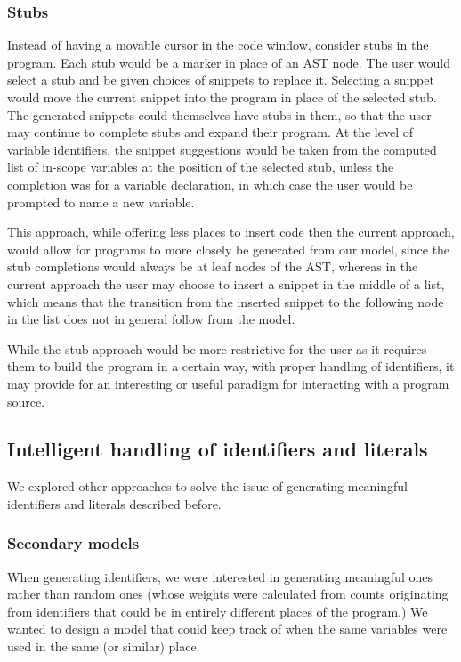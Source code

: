 \documentclass{article}
\begin{document}
\subsubsection{Stubs}

Instead of having a movable cursor in the code window, consider stubs in the
program. Each stub would be a marker in place of an AST node. The user would
select a stub and be given choices of snippets to replace it. Selecting a
snippet would move the current snippet into the program in place of the selected
stub.  The generated snippets could themselves have stubs in them, so that the
user may continue to complete stubs and expand their program.  At the level of
variable identifiers, the snippet suggestions would be taken from the computed
list of in-scope variables at the position of the selected stub, unless the
completion was for a variable declaration, in which case the user would be
prompted to name a new variable.

This approach, while offering less places to insert code then the current
approach, would allow for programs to more closely be generated from our model,
since the stub completions would always be at leaf nodes of the AST, whereas in
the current approach the user may choose to insert a snippet in the middle of a
list, which means that the transition from the inserted snippet to the following
node in the list does not in general follow from the model.

While the stub approach would be more restrictive for the user as it requires
them to build the program in a certain way, with proper handling of identifiers,
it may provide for an interesting or useful paradigm for interacting with a program
source.

\subsection{Intelligent handling of identifiers and literals}

We explored other approaches to solve the issue of generating meaningful identifiers and literals described before.

\subsubsection{Secondary models}

When generating identifiers, we were interested in generating meaningful ones rather than random ones (whose weights were calculated from counts originating from identifiers that could be in entirely different places of the program.) We wanted to design a model that could keep track of when the same variables were used in the same (or similar) place.
\end{document}
